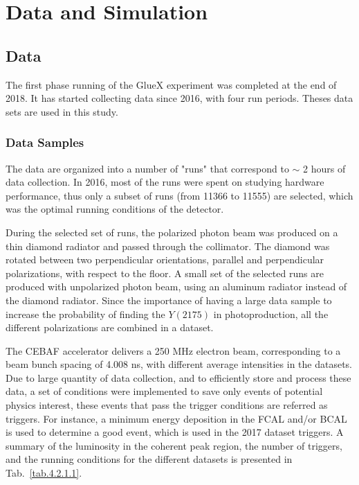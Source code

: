 \section{Data and Simulation}
\label{chap.y2175.data_mc}

\subsection{Data}

The first phase running of the GlueX experiment was completed at the end of 2018. It has started collecting data since 2016, with four run periods. Theses data sets are used in this study.

\subsubsection{Data Samples}
\label{chap.y2175.data_mc.data_samples}

The data are organized into a number of "runs" that correspond to $\sim$ 2 hours of data collection. In 2016, most of the runs were spent on studying hardware performance, thus only a subset of runs (from 11366 to 11555) are selected, which was the optimal running conditions of the detector.
~\par During the selected set of runs, the polarized photon beam was produced on a thin diamond radiator and passed through the collimator. The diamond was rotated between two perpendicular orientations, parallel and perpendicular polarizations, with respect to the floor. A small set of the selected runs are produced with unpolarized photon beam, using an aluminum radiator instead of the diamond radiator. Since the importance of having a large data sample to increase the probability of finding the $Y(2175)$ in photoproduction, all the different polarizations are combined in a dataset.
~\par The CEBAF accelerator delivers a 250 MHz electron beam, corresponding to a beam bunch spacing of 4.008 ns, with different average intensities in the datasets. Due to large quantity of data collection, and to efficiently store and process these data, a set of conditions were implemented to save only events of potential physics interest, these events that pass the trigger conditions are referred as triggers. For instance, a minimum energy deposition in the FCAL and/or BCAL is used to determine a good event, which is used in the 2017 dataset triggers. A summary of the luminosity in the coherent peak region, the number of triggers, and the running conditions for the different datasets is presented in Tab.~\ref{tab.4.2.1.1}.

